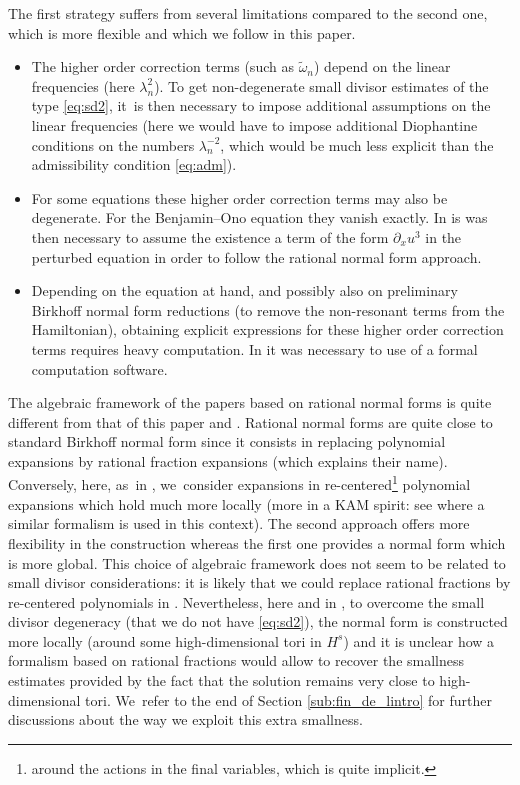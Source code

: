 \documentclass[JEP,XML,SOM,Unicode,published]{cedram}
\theoremstyle{plain}
\theoremstyle{definition}
\newcommand{\1}{\mathbf{1}}
\begin{document}
The first strategy suffers from several limitations compared to the second one, which is more flexible and which we follow in this paper.
\begin{itemize}
\item The higher order correction terms (such as $\widetilde{\omega}_n$) depend on the linear frequencies (here $\lambda_n^2$). To get non-degenerate small divisor estimates of the type \eqref{eq:sd2}, it~is then necessary to impose additional assumptions on the linear frequencies (\eg here we would have to impose additional Diophantine conditions on the numbers $\lambda_n^{-2}$, which would be much less explicit than the admissibility condition \eqref{eq:adm}).
\item For some equations these higher order correction terms may also be degenerate. For the Benjamin--Ono equation they vanish exactly. In \cite{KtA} is was then necessary to assume the existence a term of the form $\partial_x u^3$ in the perturbed equation in order to follow the rational normal form approach.
\item Depending on the equation at hand, and possibly also on preliminary Birkhoff normal form reductions (to remove the non-resonant terms from the Hamiltonian), obtaining explicit expressions for these higher order correction terms requires heavy computation. In \cite{KtA} it was necessary to use of a formal computation software.
\end{itemize}

 The algebraic framework of the papers based on rational normal forms is quite different from that of this paper and \cite{Bou00}. Rational normal forms are quite close to standard Birkhoff normal form since it consists in replacing polynomial expansions by rational fraction expansions (which explains their name). Conversely, here, as~in \cite{Bou00}, we~consider expansions in re-centered\footnote{around the actions in the final variables, which is quite implicit.} polynomial expansions which hold much more locally (more in a KAM spirit: see \cite{Bou05,BMP21} where a similar formalism is used in this context). The second approach offers more flexibility in the construction whereas the first one provides a normal form which is more global.
This choice of algebraic framework does not seem to be related to small divisor considerations: it is likely that we could replace rational fractions by re-centered polynomials in \cite{KillBill,KtA,LX23,zhiqiang}. Nevertheless, here and in \cite{Bou00}, to overcome the small divisor degeneracy (\ie that we do not have \eqref{eq:sd2}), the normal form is constructed more locally (around some high-dimensional tori in $H^s$) and it is unclear how a formalism based on rational fractions would allow to recover the smallness estimates provided by the fact that the solution remains very close to high-dimensional tori. We~refer to the end of Section \ref{sub:fin_de_lintro} for further discussions about the way we exploit this extra smallness.
\end{document}
